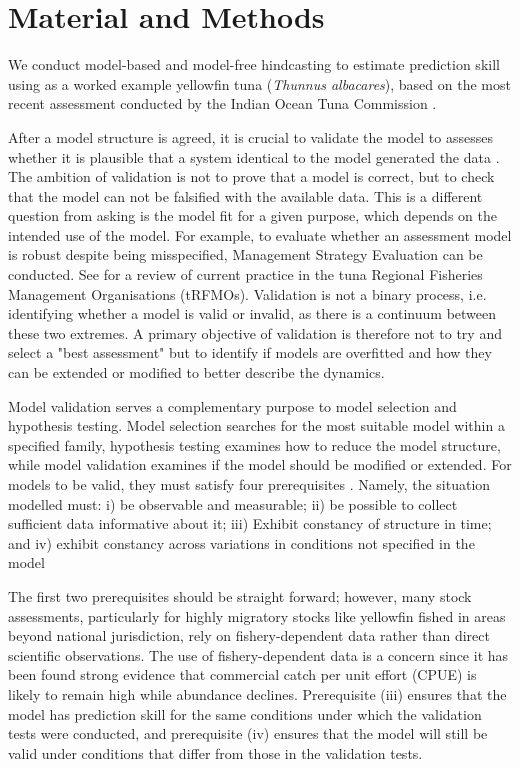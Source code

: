 \documentclass[12pt,halfline,a4paper,nonumbib]{ouparticle}
\begin{document}
\section{Material and Methods}

We conduct model-based and model-free hindcasting to estimate prediction skill using as a worked example yellowfin tuna (\textit{Thunnus albacares}), based on the most recent assessment conducted by the Indian Ocean Tuna Commission \parencite{IOTWPTT21}. 

After a model structure is agreed, it is crucial to validate the model to assesses whether it is plausible that a system identical to the model generated the data \parencite{thygesen2017validation}. The ambition of validation is not to prove that a model is correct, but to check that the model can not be falsified with the available data. This is a different question from asking is the model fit for a given purpose, which depends on the intended use of the model. For example, to evaluate whether an assessment model is robust  despite being misspecified, Management Strategy Evaluation \parencite[MSE,][]{punt2007developing} can be conducted. See \parencite{sharma2020trfmo} for a review of current practice in the tuna Regional Fisheries Management Organisations (tRFMOs). Validation is not a binary process, i.e. identifying whether a model is valid or invalid, as there is a continuum between these two extremes. A primary objective of validation is therefore not to try and select a "best assessment" but to identify if models are overfitted and how they can be extended or modified to better describe the dynamics.

Model validation serves a complementary purpose to model selection and hypothesis testing. Model selection searches for the most suitable model within a specified family, hypothesis testing examines how to reduce the model structure, while model validation examines if the model should be modified or extended. For models to be valid, they must satisfy four prerequisites \parencite{hodges1992you}. Namely, the situation modelled must: i) be observable and measurable; ii) be possible to collect sufficient data informative about it; iii) Exhibit constancy of structure in time; and iv) exhibit constancy across variations in conditions not specified in the model

The first two prerequisites should be straight forward; however, many stock assessments, particularly for highly migratory stocks like yellowfin fished in areas beyond national jurisdiction, rely on fishery-dependent data rather than direct scientific observations. The use of fishery-dependent data is a concern since \parencite{harley2001catch} it has been found strong evidence that commercial catch per unit effort (CPUE) is likely to remain high while abundance declines.  Prerequisite (iii) ensures that the model has prediction skill for the same conditions under which the validation tests were conducted, and prerequisite (iv) ensures that the model will still be valid under conditions that differ from those in the validation tests.
\end{document}
